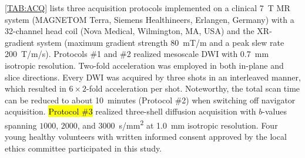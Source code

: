 \documentclass[journal,twoside,web]{ieeecolor}
\begin{document}
	\cref{TAB:ACQ} lists three acquisition protocols implemented on
	a clinical \SI{7}{\tesla} MR system
	(MAGNETOM Terra, Siemens Healthineers, Erlangen, Germany)
	with a 32-channel head coil (Nova Medical, Wilmington, MA, USA)
	and the XR-gradient system
	(maximum gradient strength \SI{80}{\milli\tesla/\meter} and
	a peak slew rate \SI{200}{\tesla/\meter/\second}).
	Protocols \#1 and \#2 realized mesoscale DWI with \SI{0.7}{mm}
	isotropic resolution. Two-fold acceleration was employed 
	in both in-plane and slice directions. 
	Every DWI was acquired by three shots in an interleaved manner, 
	which resulted in $6 \times 2$-fold acceleration per shot. 
	Noteworthy, the total scan time can be reduced to about 10~minutes 
	(Protocol \#2) when switching off navigator acquisition.
	\hl{Protocol \#3} realized three-shell diffusion acquisition 
	with $b$-values spanning $1000$, $2000$, and $3000$~\si{s/mm^2} 
	at \SI{1.0}{mm} isotropic resolution.
	Four young healthy volunteers with written informed consent
	approved by the local ethics committee
	participated in this study.


%
%
\end{document}
